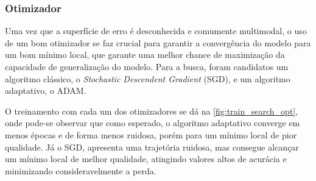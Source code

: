 \subsubsection{Otimizador}

	Uma vez que a superfície de erro é desconhecida e comumente multimodal, o uso de um bom otimizador se faz crucial para garantir a convergência do modelo para um bom mínimo local, que garante uma melhor chance de maximização da capacidade de generalização do modelo. Para a busca, foram candidatos um algoritmo clássico, o \textit{Stochastic Descendent Gradient} (SGD), e um algoritmo adaptativo, o ADAM. 
	
	O treinamento com cada um dos otimizadores se dá na \autoref{fig:train_search_opt}, onde pode-se observar que como esperado, o algoritmo adaptativo converge em menos épocas e de forma menos ruidosa, porém para um mínimo local de pior qualidade. Já o SGD, apresenta uma trajetória ruidosa, mas consegue alcançar um mínimo local de melhor qualidade, atingindo valores altos de acurácia e minimizando consideravelmente a perda.

